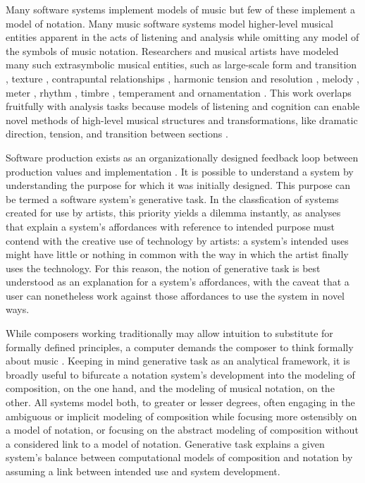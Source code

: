 \documentclass{article}
\begin{document}
Many software systems implement models of music but few of these
implement a model of notation.
Many music software systems 
model higher-level musical entities apparent in the acts
of listening and analysis while omitting any model of the symbols of music notation.
Researchers and musical artists have modeled many such extrasymbolic musical
entities, such as large-scale form and transition
\cite{polansky1991morphological, uno1994temporal, dobrian1995algorithmic,
abrams1999higher, Yoo1983}, texture \cite{Horenstein:2004kx}, contrapuntal
relationships \cite{Boenn:2009oq, Bell:1995ij, farbood2001analysis,
Cope:2002fv, Laurson:2005dz, Polansky:2011fu, Ebcioglu:1980kl}, harmonic
tension and resolution \cite{Melo2003, Wiggins1999, Foster:1995qa}, melody
\cite{Hornel:1993mi, Smith:1992pi}, meter \cite{Hamanaka:2005ff}, rhythm
\cite{Nauert2007, Degazio:1996lh, Collins:2003bs}, timbre \cite{Xenakis:1991fu,
Creasey:1996ye, Osaka2004}, temperament \cite{Seymour:2007qo, Graf:2006il} and
ornamentation \cite{Ariza:2003zt, Chico-Topfer:1998jl}. This work overlaps
fruitfully with analysis tasks because models of listening and cognition can
enable novel methods of high-level musical structures and transformations, like
dramatic direction, tension, and transition between sections
\cite{Collins2009}.

Software production
exists as an organizationally designed feedback loop between production values
and implementation \cite{Derniame:1999fk}. It is possible to understand a
system by understanding the purpose for which it was initially designed. This
purpose can be termed a software system's generative task. In the classfication of
systems created for use by artists, this priority yields a dilemma instantly,
as analyses that explain a system's affordances with reference to intended
purpose must contend with the creative use of technology by artists: a system's
intended uses might have little or nothing in common with the way in which the
artist finally uses the technology. For this reason, the notion of generative
task is best understood as an explanation for a system's affordances, with the
caveat that a user can nonetheless work against those affordances to use the
system in novel ways.

While composers working traditionally may allow intuition to substitute for
formally defined principles, a computer demands the composer to think formally
about music \cite{Xenakis:1992rq}. Keeping in mind generative task as an
analytical framework, it is broadly useful to bifurcate a  notation system's
development into the modeling of composition, on the one hand, and the modeling
of musical notation, on the other. All systems model both, to greater or lesser
degrees, often engaging in the ambiguous or implicit modeling of composition
while focusing more ostensibly on a model of notation, or focusing on the
abstract modeling of composition without a considered link to a model of
notation. Generative task explains a given system's balance between
computational models of composition and notation by assuming a link between
intended use and system development.
\end{document}
